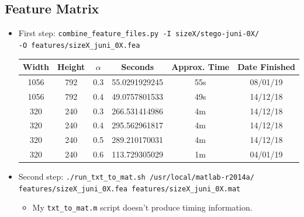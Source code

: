 \documentclass[11pt,a4paper]{report}
\begin{document}
\subsection{Feature Matrix}
\begin{itemize}
\item First step: \texttt{combine\_feature\_files.py -I sizeX/stego-juni-0X/} \\
         \texttt{-O features/sizeX\_juni\_0X.fea}
  \begin{center}
  \begin{tabular}{ c c | c | c c c }
  Width & Height & $\alpha$ & Seconds & Approx. Time & Date Finished \\ \hline
  1056 & 792 & 0.3 & 55.0291929245 & 55s & 08/01/19 \\
  1056 & 792 & 0.4 & 49.0757801533 & 49s & 14/12/18 \\
  320 & 240 & 0.3 & 266.531414986 & 4m & 14/12/18 \\
  320 & 240 & 0.4 & 295.562961817 & 4m & 14/12/18 \\
  320 & 240 & 0.5 & 289.210170031 & 4m & 14/12/18 \\
  320 & 240 & 0.6 & 113.729305029 & 1m & 04/01/19 \\
  \end{tabular}
  \end{center}

\item Second step: \texttt{./run\_txt\_to\_mat.sh /usr/local/matlab-r2014a/} \\
         \texttt{features/sizeX\_juni\_0X.fea features/sizeX\_juni\_0X.mat}
  \begin{itemize}
  \item My \texttt{txt\_to\_mat.m} script doesn't produce timing information.
  \end{itemize}
\end{itemize}
\end{document}
